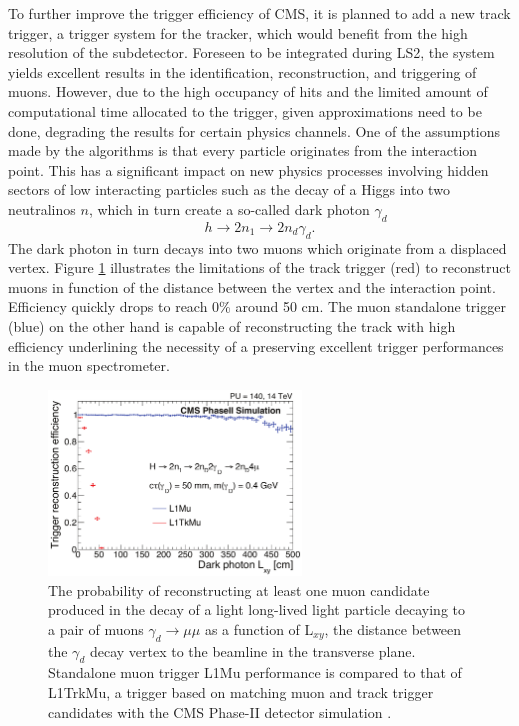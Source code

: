     To further improve the trigger efficiency of CMS, it is planned to add a new track trigger, a trigger system for the tracker, which would benefit from the high resolution of the subdetector. Foreseen to be integrated during LS2, the system yields excellent results in the identification, reconstruction, and triggering of muons. However, due to the high occupancy of hits and the limited amount of computational time allocated to the trigger, given approximations need to be done, degrading the results for certain physics channels. One of the assumptions made by the algorithms is that every particle originates from the interaction point. This has a significant impact on new physics processes involving hidden sectors of low interacting particles such as the decay of a Higgs into two neutralinos $ n $, which in turn create a so-called dark photon $ \gamma_d $
    \begin{equation}
      h \rightarrow 2 n_1 \rightarrow 2 n_d \gamma_d .
    \end{equation}
    The dark photon in turn decays into two muons which originate from a displaced vertex. Figure \ref{fig:II-1-dark-photon} illustrates the limitations of the track trigger (red) to reconstruct muons in function of the distance between the vertex and the interaction point. Efficiency quickly drops to reach 0\% around 50 cm. The muon standalone trigger (blue) on the other hand is capable of reconstructing the track with high efficiency underlining the necessity of a preserving excellent trigger performances in the muon spectrometer.

    \begin{figure}[h!]
      \centering
      \includegraphics[width=0.6\textwidth]{img/II-1-gem/dark-photon.pdf}
      \caption{The probability of reconstructing at least one muon candidate produced in the decay of a light long-lived light particle decaying to a pair of muons $\gamma_d \rightarrow \mu \mu $ as a function of L$_{xy}$, the distance between the $\gamma_d$ decay vertex to the beamline in the transverse plane. Standalone muon trigger L1Mu performance is compared to that of L1TrkMu, a trigger based on matching muon and track trigger candidates with the CMS Phase-II detector simulation \cite{Colaleo:2021453}.}
      \label{fig:II-1-dark-photon}
    \end{figure}

